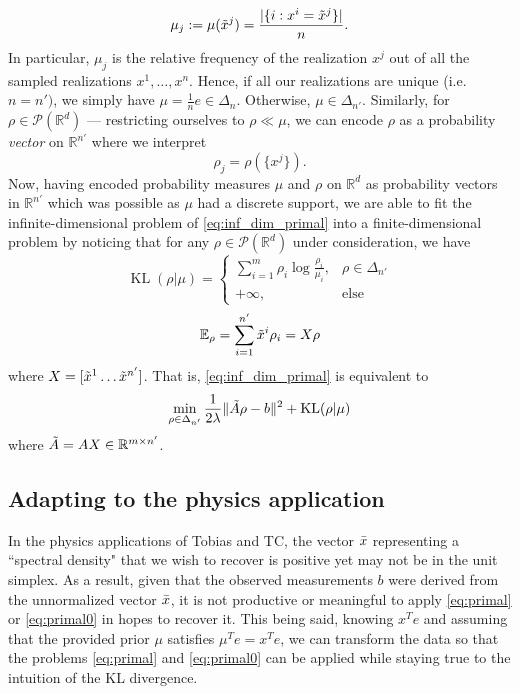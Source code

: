 \documentclass[10pt,a4paper]{article}
\numberwithin{equation}{section}
\theoremstyle{definition}
\def\rr{{\mathbb R}}
\def\ee{{\mathbb E}}
\DeclareMathOperator{\KL}{KL}
\begin{document}
\[
\mu_j := \mu(\Tilde{x}^j) = \frac{|\{i: x^i = \Tilde{x}^j\}|}{n}.
\]
In particular, $\mu_j$ is the relative frequency of the realization $x^j$ out of all the sampled realizations $x^1, \dots, x^n$. Hence, if all our realizations are unique (i.e. $n = n')$, we simply have $\mu = \frac{1}{n} e \in \Delta_n$. Otherwise, $\mu \in \Delta_{n'}$. Similarly, for $\rho \in \mathcal{P}(\rr^d)$ --- restricting ourselves to $\rho \ll \mu$, we can encode $\rho$ as a probability \emph{vector} on $\rr^{n'}$ where we interpret
\[
\rho_j = \rho(\{x^j\}).
\]
Now, having encoded probability measures $\mu$ and $\rho$ on $\rr^d$ as probability vectors in $\rr^{n'}$ which was possible as $\mu$ had a discrete support, we are able to fit the infinite-dimensional problem of \eqref{eq:inf_dim_primal} into a finite-dimensional problem by noticing that for any $\rho \in \mathcal{P}(\rr^d)$ under consideration, we have 
\[
\KL(\rho|\mu) = \begin{cases}
			\sum_{i=1}^m \rho_i \log\frac{\rho_i}{\mu_i}, & \rho \in \Delta_{n'} \\
            + \infty, & \text{else}
		 \end{cases}
\]
\[
\ee_\rho = \sum_{i=1}^{n'} \Tilde{x}^i \rho_i = X \rho
\]
where $X = [\Tilde{x}^1 \dots \Tilde{x}^{n'}]$. That is, \eqref{eq:inf_dim_primal} is equivalent to 
\[
 \min_{\rho \in \Delta_{n'}} \frac{1}{2 \lambda} \lVert \Tilde{A}\rho - b \rVert^2 + \KL(\rho| \mu)
\]
where $\Tilde{A} = A X \in \rr^{m \times n'}$.

\subsection{Adapting to the physics application}

In the physics applications of Tobias and TC, the vector $\Bar{x}$ representing a ``spectral density" that we wish to recover is positive yet may not be in the unit simplex. As a result, given that the observed measurements $b$ were derived from the unnormalized vector $\Bar{x}$, it is not productive or meaningful to apply \eqref{eq:primal} or \eqref{eq:primal0} in hopes to recover it. This being said, knowing $x^Te$ and assuming that the provided prior $\mu$ satisfies $\mu^Te = x^Te$, we can transform the data so that the problems \eqref{eq:primal} and \eqref{eq:primal0} can be applied while staying true to the intuition of the KL divergence. 
\end{document}
